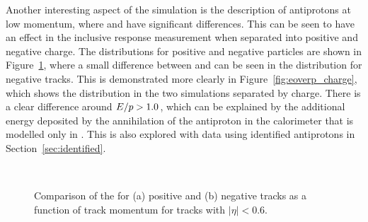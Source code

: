 Another interesting aspect of the simulation is the description of antiprotons at low momentum, where \QGSP and \FTFP have significant differences.
This can be seen to have an effect in the inclusive response measurement when separated into positive and negative charge.
The \epcor distributions for positive and negative particles are shown in Figure~\ref{fig:eoverp_corrected_charge}, where a small difference between \QGSP and \FTFP can be seen in the distribution for negative tracks.
This is demonstrated more clearly in Figure~\ref{fig:eoverp_charge}, which shows the \ep distribution in the two simulations separated by charge.
There is a clear difference around $E/p > 1.0$, which can be explained by the additional energy deposited by the annihilation of the antiproton in the calorimeter that is modelled only in \FTFP.
This is also explored with data using identified antiprotons in Section~\ref{sec:identified}. 

\begin{figure}[h]
\centering
{}
~
\caption{Comparison of the \epcor for (a) positive and (b) negative tracks as a function of track momentum for tracks with $|\eta|<0.6$.}
\label{fig:eoverp_corrected_charge}
\end{figure}

